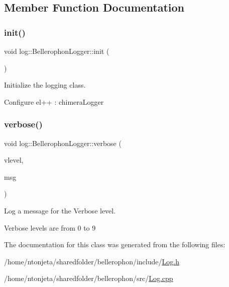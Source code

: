 \subsection{Member Function Documentation}
\hypertarget{classbellerophon_1_1log_1_1BellerophonLogger_a780401375c00ff261d6879d7ccf21861}{}\label{classbellerophon_1_1log_1_1BellerophonLogger_a780401375c00ff261d6879d7ccf21861} 
\subsubsection{\texorpdfstring{init()}{init()}}
{\footnotesize\ttfamily void log\+::\+Bellerophon\+Logger\+::init (\begin{DoxyParamCaption}{ }\end{DoxyParamCaption})\hspace{0.3cm}{\ttfamily [static]}}



Initialize the logging class. 

Configure el++ \+: chimera\+Logger \hypertarget{classbellerophon_1_1log_1_1BellerophonLogger_ad498ff6881211ff767a187e149c6ef53}{}\label{classbellerophon_1_1log_1_1BellerophonLogger_ad498ff6881211ff767a187e149c6ef53} 
\subsubsection{\texorpdfstring{verbose()}{verbose()}}
{\footnotesize\ttfamily void log\+::\+Bellerophon\+Logger\+::verbose (\begin{DoxyParamCaption}\item[{Verbose\+Level}]{vlevel,  }\item[{const std\+::string \&}]{msg }\end{DoxyParamCaption})\hspace{0.3cm}{\ttfamily [static]}}



Log a message for the Verbose level. 

Verbose levels are from 0 to 9 

The documentation for this class was generated from the following files\+:\begin{DoxyCompactItemize}
\item 
/home/ntonjeta/sharedfolder/bellerophon/include/\hyperlink{Log_8h}{Log.\+h}\item 
/home/ntonjeta/sharedfolder/bellerophon/src/\hyperlink{Log_8cpp}{Log.\+cpp}\end{DoxyCompactItemize}

